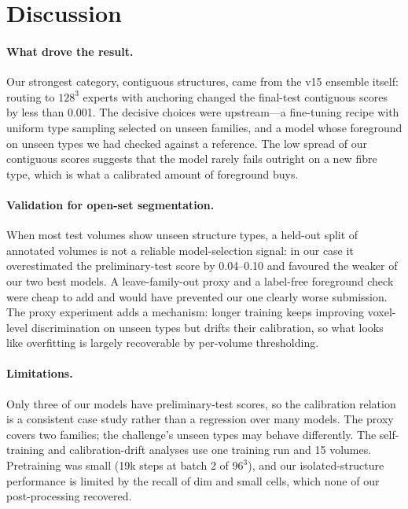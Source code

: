 \documentclass[11pt,a4paper]{article}
\begin{document}
\section{Discussion}

\paragraph{What drove the result.} Our strongest category, contiguous structures, came from the v15 ensemble itself: routing to $128^3$ experts with anchoring changed the final-test contiguous scores by less than 0.001. The decisive choices were upstream---a fine-tuning recipe with uniform type sampling selected on unseen families, and a model whose foreground on unseen types we had checked against a reference. The low spread of our contiguous scores suggests that the model rarely fails outright on a new fibre type, which is what a calibrated amount of foreground buys.

\paragraph{Validation for open-set segmentation.} When most test volumes show unseen structure types, a held-out split of annotated volumes is not a reliable model-selection signal: in our case it overestimated the preliminary-test score by 0.04--0.10 and favoured the weaker of our two best models. A leave-family-out proxy and a label-free foreground check were cheap to add and would have prevented our one clearly worse submission. The proxy experiment adds a mechanism: longer training keeps improving voxel-level discrimination on unseen types but drifts their calibration, so what looks like overfitting is largely recoverable by per-volume thresholding.

\paragraph{Limitations.} Only three of our models have preliminary-test scores, so the calibration relation is a consistent case study rather than a regression over many models. The proxy covers two families; the challenge's unseen types may behave differently. The self-training and calibration-drift analyses use one training run and 15 volumes. Pretraining was small (19k steps at batch 2 of $96^3$), and our isolated-structure performance is limited by the recall of dim and small cells, which none of our post-processing recovered.
\end{document}

